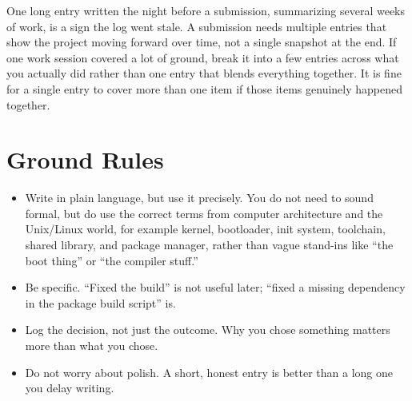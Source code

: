 \documentclass[11pt]{article}
\begin{document}
\begin{tipBox}
One long entry written the night before a submission, summarizing several weeks of work, is a sign the log went stale. A submission needs multiple entries that show the project moving forward over time, not a single snapshot at the end. If one work session covered a lot of ground, break it into a few entries across what you actually did rather than one entry that blends everything together. It is fine for a single entry to cover more than one item if those items genuinely happened together.
\end{tipBox}

\section{Ground Rules}

\begin{itemize}
  \item Write in plain language, but use it precisely. You do not need to sound formal, but do use the correct terms from computer architecture and the Unix/Linux world, for example kernel, bootloader, init system, toolchain, shared library, and package manager, rather than vague stand-ins like ``the boot thing'' or ``the compiler stuff.''
  \item Be specific. ``Fixed the build'' is not useful later; ``fixed a missing dependency in the package build script'' is.
  \item Log the decision, not just the outcome. Why you chose something matters more than what you chose.
  \item Do not worry about polish. A short, honest entry is better than a long one you delay writing.
\end{itemize}
\end{document}
